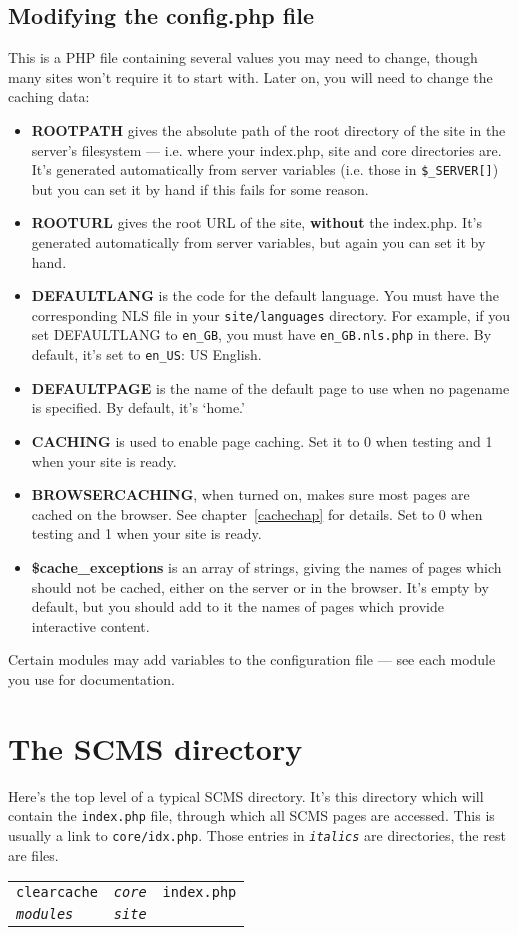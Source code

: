 
\subsection{Modifying the config.php file}
\label{modiconfig}
This is a PHP file containing several values you may need to change, though
many sites won't require it to start with. Later on, you will need to change
the caching data:
\begin{itemize}
 \item \textbf{ROOTPATH} gives the absolute path of the root directory of the site in the server's filesystem --- i.e. where your index.php, site and core directories are. It's
 generated automatically from server variables (i.e. those in \verb,$_SERVER[],) but you can set it by hand if this
 fails for some reason.
 \item \textbf{ROOTURL} gives the root URL of the site, \textbf{without} the index.php. It's generated automatically
 from server variables, but again you can set it by hand.
\item \textbf{DEFAULTLANG} is the code for the default language. You must have the corresponding NLS file in your \texttt{site/languages} directory.
For example, if you set DEFAULTLANG to \texttt{en\_GB}, you must have \texttt{en\_GB.nls.php} in there. By default, it's set to \texttt{en\_US}: US English.
\item \textbf{DEFAULTPAGE} is the name of the default page to use when no pagename is specified. By default, it's `home.'
\item \textbf{CACHING} is used to enable page caching. Set it to 0 when testing and 1 when your site is ready.
\item \textbf{BROWSERCACHING}, when turned on, makes sure most pages are cached on the browser. See chapter~\ref{cachechap} for details. Set to 0 when testing and 1 when your site is ready.
\item \textbf{\$cache\_exceptions} is an array of strings, giving the names of pages which should not be cached, either on the server or in the browser.
It's empty by default, but you should add to it the names of pages which provide interactive content.
\end{itemize}
Certain modules may add variables to the configuration file --- see each module you use for documentation.

\section{The SCMS directory}
Here's the top level of a typical SCMS directory. It's this directory which will contain the \texttt{index.php} file, through which all SCMS pages are accessed. This
is usually a link to \texttt{core/idx.php}.
Those entries in \emph{\texttt{italics}} are directories, the rest are files.
\begin{center}
\begin{tabular}{lll}
\texttt{clearcache} & \emph{\texttt{core}} & \texttt{index.php}  \\ 
\emph{\texttt{modules}} & \emph{\texttt{site}}
\end{tabular}
\end{center}

